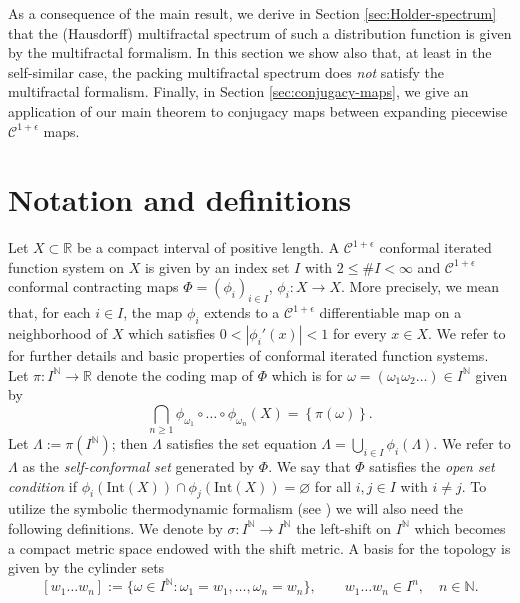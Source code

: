 \documentclass[11pt]{amsart}
\newcommand\NN{\mathbb{N}}
\newcommand\RR{\mathbb{R}}
\newcommand\Int{\mathrm{Int}}
\newcommand{\1}{1}
\newcommand{\N}{\mathbb{N}}
\newcommand{\R}{\mathbb{R}}
\renewcommand{\emptyset}{\varnothing}
\begin{document}
As a consequence of the main result, we derive in Section \ref{sec:Holder-spectrum} that the (Hausdorff) multifractal spectrum of such a distribution function is given by the multifractal formalism. In this section we show also that, at least in the self-similar case, the packing multifractal spectrum does {\em not} satisfy the multifractal formalism. Finally, in Section \ref{sec:conjugacy-maps}, we give an application of our main theorem to conjugacy maps between expanding piecewise $\mathcal{C}^{1+\epsilon}$ maps.


\section{Notation and definitions} \label{sec:notation}

Let  $X\subset \RR$ be a compact interval of positive length. A $\mathcal{C}^{1+\epsilon}$ conformal iterated function system on $X$ is given by an index set $I$ with $2\le \#I<\infty$ and $\mathcal{C}^{1+\epsilon}$ conformal contracting maps $\Phi=(\phi_{i})_{i\in I}$, $\phi_{i}:X\rightarrow X$.
More precisely, we mean that,   for each $i\in I$, the map $\phi_i$ extends to a 
$\mathcal{C}^{1+\epsilon}$ differentiable map on a neighborhood of $X$ which 
satisfies $0<\left| \phi_{i}'(x) \right|<1$ for every $x\in X$. 
We refer to \cite{Mauldin-Urbanski} for further details and basic properties of conformal 
iterated function systems.
Let $\pi:I^{\N}\rightarrow\R$ denote the coding map of $\Phi$ which is for $\omega=(\omega_{1}\omega_{2}\dots)\in I^{\N}$ given by 
\[
\bigcap_{n\ge1}\phi_{\omega_{1}}\circ\dots\circ\phi_{\omega_{n}}(X)=\left\{ \pi(\omega)\right\} .
\]
Let $\Lambda:=\pi(I^{\N})$; then $\Lambda$ satisfies the set equation $\Lambda=\bigcup_{i\in I}\phi_i(\Lambda)$. We refer to $\Lambda$ as the \emph{self-conformal set} generated by $\Phi$. We say that $\Phi$ satisfies the {\em open set condition} if $\phi_{i}(\Int(X))\cap\phi_{j}(\Int(X))=\emptyset$ for all $i,j\in I$ with $i\neq j$.
To utilize the symbolic thermodynamic formalism (see \cite{bowen-equilibrium}) we will also need the following definitions. We denote by $\sigma:I^{\N}\rightarrow I^{\N}$ the left-shift on $I^{\N}$ which becomes a compact metric space endowed with the shift metric. A basis for the topology is given by the cylinder sets 
\[
[w_1\dots w_n]:=\{ \omega \in I^\N:\omega_1=w_1,\dots, \omega_n=w_n\}, \qquad w_1\dots w_n\in I^n, \quad n\in\NN.
\]
\end{document}
